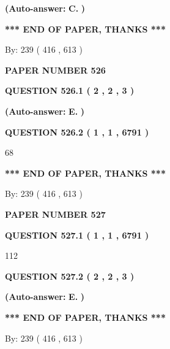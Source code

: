 \documentclass{ctexart}
\begin{document}
 
{\textbf{(Auto-answer:}}
{\textbf{\large{
C.}}}
{\textbf{)}}
 
 
   
   
   
   
\vspace{1.0in} 
{\textbf{\large{ *** END OF PAPER, THANKS *** }}} 
   
   
\hspace{1.0in} By: 
 239 ( 416 ,  613 )
   
   
   
   
\newpage 
\setcounter{page}{ 
   526001 } 
   
   
 {\textbf{ \Large{ PAPER NUMBER  526  }}}
   
   
   
   
  
  
{\textbf{\large{QUESTION
526.1 
 ( 2 , 2 , 3 )
}}}
 
 
{\textbf{(Auto-answer:}}
{\textbf{\large{
E.}}}
{\textbf{)}}
 
 
  
  
{\textbf{\large{QUESTION
526.2 
 ( 1 , 1 , 6791 )
}}}

68
   
   
   
   
\vspace{1.0in} 
{\textbf{\large{ *** END OF PAPER, THANKS *** }}} 
   
   
\hspace{1.0in} By: 
 239 ( 416 ,  613 )
   
   
   
   
\newpage 
\setcounter{page}{ 
   527001 } 
   
   
 {\textbf{ \Large{ PAPER NUMBER  527  }}}
   
   
   
   
  
  
{\textbf{\large{QUESTION
527.1 
 ( 1 , 1 , 6791 )
}}}

112
  
  
{\textbf{\large{QUESTION
527.2 
 ( 2 , 2 , 3 )
}}}
 
 
{\textbf{(Auto-answer:}}
{\textbf{\large{
E.}}}
{\textbf{)}}
 
 
   
   
   
   
\vspace{1.0in} 
{\textbf{\large{ *** END OF PAPER, THANKS *** }}} 
   
   
\hspace{1.0in} By: 
 239 ( 416 ,  613 )
   
   
   
\end{document}

